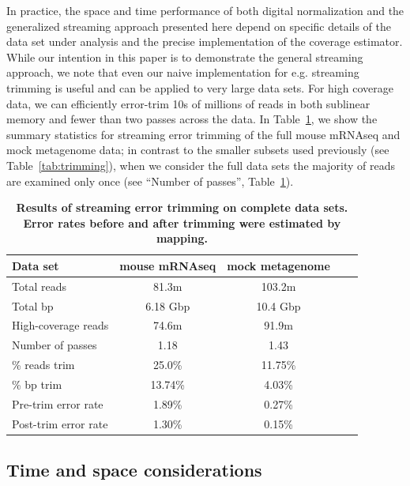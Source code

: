 \documentclass{article}
\begin{document}
In practice, the space and time performance of both digital
normalization and the generalized streaming approach presented here
depend on specific details of the data set under analysis and the
precise implementation of the coverage estimator. While our intention
in this paper is to demonstrate the general streaming approach, we
note that even our naive implementation for e.g. streaming trimming is
useful and can be applied to very large data sets.  For high coverage
data, we can efficiently error-trim 10s of millions of reads in both
sublinear memory and fewer than two passes across the data.  In
Table~\ref{tab:full_trimming}, we show the summary statistics for
streaming error trimming of the full mouse mRNAseq and mock metagenome
data; in contrast to the smaller subsets used previously (see
Table~\ref{tab:trimming}), when we consider the full data sets the
majority of reads are examined only once (see ``Number of passes'',
Table~\ref{tab:full_trimming}).


\begin{table}
\centering
\begin{tabular}{|l|c|c|c|c|}
\hline

Data set             & mouse mRNAseq      & mock metagenome \\
\hline
Total reads          & 81.3m         & 103.2m \\
Total bp             & 6.18 Gbp      & 10.4 Gbp \\
High-coverage reads  & 74.6m         & 91.9m \\
Number of passes     & 1.18          & 1.43 \\
\% reads trim        & 25.0\%        & 11.75\% \\
\% bp trim           & 13.74\%       & 4.03\% \\
Pre-trim error rate  & 1.89\%        & 0.27\% \\
Post-trim error rate & 1.30\%        & 0.15\% \\
\hline
\end{tabular}

\caption{{\bf Results of streaming error trimming on complete data sets.
Error rates before and after trimming were estimated by mapping.}}
\label{tab:full_trimming}
\end{table}

\subsection{Time and space considerations}
\end{document}
